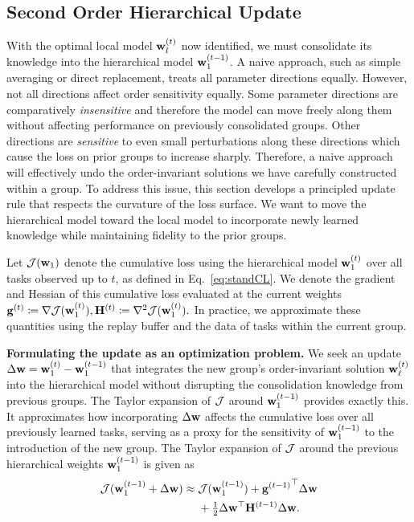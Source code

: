 \subsection{Second Order Hierarchical Update}
\label{sec:hierarchical_update}
With the optimal local model $\mathbf{w}_l^{(t)}$ now identified, we must consolidate its knowledge into the hierarchical model $\mathbf{w}_{1}^{(t-1)}$. A naive approach, such as simple averaging or direct replacement, treats all parameter directions equally. However, not all directions affect order sensitivity equally. Some parameter directions are comparatively \emph{insensitive} and therefore the model can move freely along them without affecting performance on previously consolidated groups. Other directions are \emph{sensitive} to even small perturbations along these directions which cause the loss on prior groups to increase sharply. Therefore, a naive approach will effectively undo the order-invariant solutions we have carefully constructed within a group. To address this issue, this section develops a principled update rule that respects the curvature of the loss surface. We want to move the hierarchical model toward the local model to incorporate newly learned knowledge while maintaining fidelity to the prior groups.

Let $\mathcal{J}(\mathbf{w}_1)$ denote the cumulative loss using the hierarchical model $\mathbf{w}_1^{(t)}$ over all tasks observed up to $t$, as defined in Eq.~\ref{eq:standCL}. We denote the gradient and Hessian of this cumulative loss evaluated at the current weights $\mathbf{g}^{(t)} \coloneqq \nabla \mathcal{J}(\mathbf{w}_{1}^{(t)}),
     \mathbf{H}^{(t)} \coloneqq \nabla^2 \mathcal{J}(\mathbf{w}_{1}^{(t)}).$ In practice, we approximate these quantities using the replay buffer and the data of tasks within the current group.

\textbf{Formulating the update as an optimization problem.} We seek an update $\Delta\mathbf{w} = \mathbf{w}_{1}^{(t)} - \mathbf{w}_{1}^{(t-1)}$ that integrates the new group's order-invariant solution $\mathbf{w}_{\ell}^{(t)}$ into the hierarchical model without disrupting the consolidation knowledge from previous groups. The Taylor expansion of $\mathcal{J}$ around $\mathbf{w}_{1}^{(t-1)}$ provides exactly this. It approximates how incorporating $\Delta\mathbf{w}$ affects the cumulative loss over all previously learned tasks, serving as a proxy for the sensitivity of $\mathbf{w}_{1}^{(t-1)}$ to the introduction of the new group. The Taylor expansion of $\mathcal{J}$ around the previous hierarchical weights $\mathbf{w}_{1}^{(t-1)}$ is given as
\begin{align}
    \label{eq:taylor-exp}
    \begin{split}
        \mathcal{J}(\mathbf{w}_{1}^{(t-1)} + \Delta\mathbf{w}) \approx{} & \mathcal{J}(\mathbf{w}_{1}^{(t-1)}) + {\mathbf{g}^{(t-1)}}^\top \Delta\mathbf{w} \\
        & + \tfrac{1}{2} \Delta\mathbf{w}^\top \mathbf{H}^{(t-1)} \Delta\mathbf{w} .
    \end{split}
\end{align}

